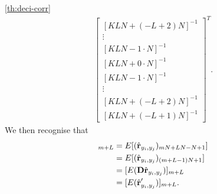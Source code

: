 \documentclass[a4paper, openany, oneside]{memoir}
\begin{document}
\begin{blockProofTheorem}{\ref{th:deci-corr}}
\begin{align*}
\begin{bmatrix}
            [KLN+(-L+2)N]^{-1} \\
            \vdots \\
            [KLN -1 \cdot N]^{-1} \\
            [KLN+ 0 \cdot N]^{-1} \\
            [KLN -1 \cdot N]^{-1} \\
            \vdots \\
            [KLN+(-L+2)N]^{-1} \\
            [KLN+(-L+1)N]^{-1}
         \end{bmatrix}^T.
    \end{align*}
    We then recognise that
    \begin{align*}
        [E(\vec{w} \odot N\hat{\vec{r}}_{y'_i,y'_j})]_{m+L} &= E[(\hat{\vec{r}}_{y_i,y_j})_{mN+LN-N+1}] \\
        &= E[(\hat{\vec{r}}_{y_i,y_j})_{(m+L-1)N+1}] \\
        &= [E(\mat{D} \hat{\vec{r}}_{y_i,y_j})]_{m+L} \\
        &= [E(\hat{\vec{r}}'_{y_i,y_j})]_{m+L}.
    \end{align*}
\end{blockProofTheorem}
\end{document}
